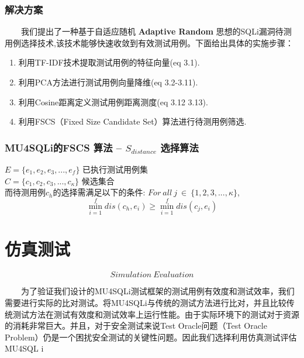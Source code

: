 \documentclass{beamer}
\begin{document}
\begin{CJK*}{UTF8}{}
\begin{frame}
\frametitle{解决方案}
~~~~我们提出了一种基于自适应随机 {\bf Adaptive Random} 思想的SQLi漏洞待测用例选择技术,该技术能够快速收敛到有效测试用例。下面给出具体的实施步骤：\bigskip\\
\begin{enumerate}[Step 1]
\item 利用TF-IDF技术提取测试用例的特征向量(eq 3.1).
\item 利用PCA方法进行测试用例向量降维(eq 3.2-3.11).
\item 利用Cosine距离定义测试用例距离测度(eq 3.12 3.13).
\item 利用FSCS（Fixed Size Candidate Set）算法进行待测用例筛选.
\end{enumerate}
\end{frame}
\begin{frame}
\frametitle{MU4SQLi的FSCS 算法 -- $S_{distance}$ 选择算法}
 $E = \{e_{1}, e_{2}, e_{3}, ..., e_{f}\}$ 已执行测试用例集\\ $C= \{c_{1}, c_{2}, c_{3}, ..., c_{\kappa}\}$ 候选集合\bigskip\\
 而待测用例$c_{h}$的选择需满足以下的条件:
$For~ all ~ j~ \in~ \{1, 2, 3, ..., \kappa\} $, $$\min_{i=1}^{f} dis(c_{h}, e_{i}) \geq \min_{i=1}^{f} dis(c_{j}, e_{i}) $$
\end{frame}







\section{仿真测试}
\begin{frame}
$$Simulation~Evaluation$$
\end{frame}

\begin{frame}
~~~~为了验证我们设计的MU4SQLi测试框架的测试用例有效度和测试效率，我们需要进行实际的比对测试。将MU4SQLi与传统的测试方法进行比对，并且比较传统测试方法在测试有效度和测试效率上运行性能。由于实际环境下的测试对于资源的消耗非常巨大。并且，对于安全测试来说Test Oracle问题（Test Oracle Problem）仍是一个困扰安全测试的关键性问题。因此我们选择利用仿真测试评估MU4SQL i
\end{frame}


\end{CJK*}
\end{document}
